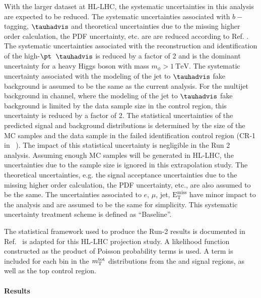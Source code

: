 With the larger dataset at HL-LHC, the systematic uncertainties in this analysis are expected to be reduced.
The systematic uncertainties associated with $b-$tagging, $\tauhadvis$ and theoretical uncertainties due to 
the missing higher order calculation, the PDF uncertainty, etc. are are reduced according to 
Ref. \cite{LHATLASdetectorSystScale}. The systematic uncertainties associated with the reconstruction 
and identification of the high-$\pt$~$\tauhadvis$ is reduced by a factor of 2 and is the dominant 
uncertainty for a heavy Higgs boson with mass $m_{\phi} >\SI{1}{\TeV}$. The systematic uncertainty associated 
with the modeling of the jet to $\tauhadvis$ fake background is assumed to be the same as the current analysis.
For the multijet background in \hadhad channel, where the modeling of the jet to $\tauhadvis$ fake background 
is limited by the data sample size in the control region, this uncertainty is reduced by a factor of 2. 
The statistical uncertainties of the predicted signal and background distributions is determined 
by the size of the MC samples and the data sample in the failed \tauhadvis identification control region 
(CR-1 in ~\cite{ATLASRun2Ditau}). The impact of this statistical uncertainty is negligible in the Run 2 analysis. 
Assuming enough MC samples will be generated in HL-LHC, the uncertainties due to 
the sample size is ignored in this extrapolation study. The theoretical uncertainties, e.g. the signal acceptance 
uncertainties due to the missing higher order calculation, the PDF uncertainty, etc., are also assumed to be 
the same. The uncertainties associated to $e$, $\mu$, jet, $\mathrm{E^{miss}_T}$ have minor impact to the analysis 
and are assumed to be the same for simplicity. This systematic uncertainty treatment scheme is defined as ``Baseline''. 

The statistical framework used to produce the Run-2 results is documented in Ref.~\cite{ATLASRun2Ditau} is adapted 
for this HL-LHC projection study. A likelihood function constructed as the product of Poisson probability terms 
is used. A term is included for each bin in the $m_\textnormal{T}^\textnormal{tot}$ distributions from the \lephad and \hadhad signal regions, 
as well as the top control region. 

\paragraph{Results}
\label{sec:result}

